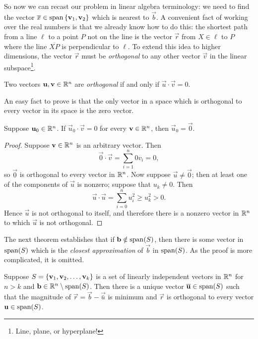 \documentclass[m3380-lec-main.tex]{subfiles}
\begin{document}
So now we can recast our problem in linear algebra terminology: we need to find the vector $\overline{x}\in\operatorname{span}\left\{\mathbf{v}_1,\mathbf{v}_2\right\}$ which is nearest to $\vec{b}$. A convenient fact of working over the real numbers is that we already know how to do this: the shortest path from a line $\ell$ to a point $P$ not on the line is the vector $\vec{r}$ from $X\in\ell$ to $P$ where the line $\overline{XP}$ is perpendicular to $\ell$. To extend this idea to higher dimensions, the vector $\vec{r}$ must be \emph{orthogonal} to any other vector $\vec{v}$ in the linear subspace\footnote{Line, plane, or hyperplane!}.

\begin{defn} Two vectors $\mathbf{u}, \mathbf{v}\in\mathbb{R}^n$ are \emph{orthogonal} if and only if $\vec{u}\cdot\vec{v}=0$.
\end{defn}

An easy fact to prove is that the only vector in a space which is orthogonal to every vector in its space is the zero vector.

\begin{thm} Suppose $\mathbf{u}_0\in\mathbb{R}^n$. If $\vec{u}_0\cdot\vec{v}=0$ for every $\mathbf{v}\in\mathbb{R}^n$, then $\vec{u}_0 = \vec{0}$.
\end{thm}
\begin{proof} Suppose $\mathbf{v}\in\mathbb{R}^n$ is an arbitrary vector. Then 
\[\vec{0}\cdot \vec{v} = \sum_{i=1}^n 0v_i = 0,\]
so $\vec{0}$ is orthogonal to every vector in $\mathbb{R}^n$. Now suppose $\vec{u}\neq \vec{0}$; then at least one of the components of $\vec{u}$ is nonzero; suppose that $u_k\neq 0$. Then 
\[\vec{u}\cdot\vec{u} = \sum_{i=0}^n u_i^2 \geq u_k^2 > 0.\]
Hence $\vec{u}$ is not orthogonal to itself, and therefore there is a nonzero vector in $\mathbb{R}^n$ to which $\vec{u}$ is not orthogonal.
\end{proof}

The next theorem establishes that if $\mathbf{b}\notin\operatorname{span}(S)$, then there is some vector in $\operatorname{span}(S)$ which is the \emph{closest approximation} of $\vec{b}$ in $\operatorname{span}(S)$. As the proof is more complicated, it is omitted.

\begin{thm} Suppose $S=\left\{\mathbf{v}_1,\mathbf{v}_2,\ldots,\mathbf{v}_k\right\}$ is a set of linearly independent vectors in $\mathbb{R}^n$ for $n>k$ and $\mathbf{b}\in\mathbb{R}^n\setminus\operatorname{span}(S)$. Then there is a unique vector $\mathbf{\overline{u}}\in\operatorname{span}(S)$ such that the magnitude of $\vec{r}=\vec{b}-\vec{\bar{u}}$ is minimum and $\vec{r}$ is orthogonal to every vector $\mathbf{u}\in\operatorname{span}(S)$.
\end{thm}
\end{document}
